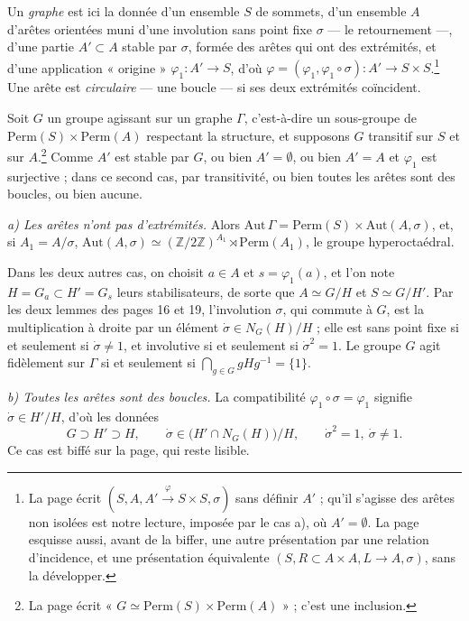 \documentclass[11pt,a4paper]{article}
\begin{document}
Un \emph{graphe} est ici la donnée d'un ensemble $S$ de sommets, d'un
ensemble $A$ d'arêtes orientées muni d'une involution sans point fixe
$\sigma$ --- le retournement ---, d'une partie $A' \subset A$ stable par
$\sigma$, formée des arêtes qui ont des extrémités, et d'une application
« origine » $\varphi_1 : A' \to S$, d'où
$\varphi = (\varphi_1, \varphi_1 \circ \sigma) : A' \to S \times S$.\footnote{La
page écrit
$(S, A, A' \xrightarrow{\varphi} S \times S, \sigma)$ sans définir $A'$ ;
qu'il s'agisse des arêtes non isolées est notre lecture, imposée par le cas
a), où $A' = \emptyset$. La page esquisse aussi, avant de la biffer, une
autre présentation par une relation d'incidence, et une présentation
équivalente $(S, R \subset A \times A, L \to A, \sigma)$, sans la développer.}
Une arête est \emph{circulaire} --- une boucle --- si ses deux extrémités
coïncident.

Soit $G$ un groupe agissant sur un graphe $\Gamma$, c'est-à-dire un
sous-groupe de $\mathrm{Perm}(S) \times \mathrm{Perm}(A)$ respectant la
structure, et supposons $G$ transitif sur $S$ et sur $A$.\footnote{La page
écrit « $G \simeq \mathrm{Perm}(S) \times \mathrm{Perm}(A)$ » ; c'est une
inclusion.} Comme $A'$ est stable par $G$, ou bien $A' = \emptyset$, ou bien
$A' = A$ et $\varphi_1$ est surjective ; dans ce second cas, par
transitivité, ou bien toutes les arêtes sont des boucles, ou bien aucune.

\emph{a) Les arêtes n'ont pas d'extrémités.} Alors
$\mathrm{Aut}\,\Gamma = \mathrm{Perm}(S) \times \mathrm{Aut}(A, \sigma)$, et, si
$A_1 = A/\sigma$,
$\mathrm{Aut}(A, \sigma) \simeq (\mathbb{Z}/2\mathbb{Z})^{A_1} \rtimes \mathrm{Perm}(A_1)$,
le groupe hyperoctaédral.

Dans les deux autres cas, on choisit $a \in A$ et $s = \varphi_1(a)$, et l'on
note $H = G_a \subset H' = G_s$ leurs stabilisateurs, de sorte que
$A \simeq G/H$ et $S \simeq G/H'$. Par les deux lemmes des pages 16 et 19,
l'involution $\sigma$, qui commute à $G$, est la multiplication à droite par
un élément $\dot\sigma \in N_G(H)/H$ ; elle est sans point fixe si et
seulement si $\dot\sigma \neq 1$, et involutive si et seulement si
$\dot\sigma^{2} = 1$. Le groupe $G$ agit fidèlement sur $\Gamma$ si et
seulement si $\bigcap_{g \in G} g H g^{-1} = \{1\}$.

\emph{b) Toutes les arêtes sont des boucles.} La compatibilité
$\varphi_1 \circ \sigma = \varphi_1$ signifie $\dot\sigma \in H'/H$, d'où les
données
\[
G \supset H' \supset H,\qquad \dot\sigma \in \bigl(H' \cap N_G(H)\bigr)/H,\qquad \dot\sigma^{2} = 1,\ \dot\sigma \neq 1 .
\]
Ce cas est biffé sur la page, qui reste lisible.
\end{document}
